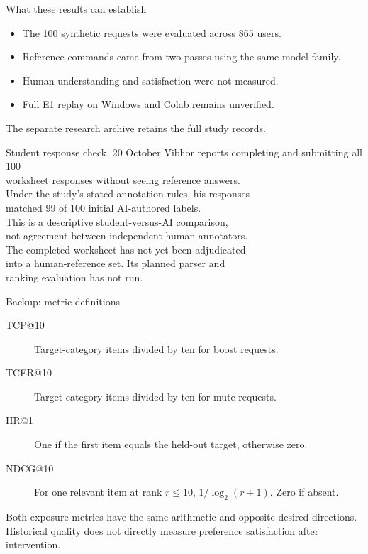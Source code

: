 \documentclass[10pt]{beamer}
\begin{document}
\begin{frame}{What these results can establish}
\small
\begin{itemize}
\item The 100 synthetic requests were evaluated across 865 users.
\item Reference commands came from two passes using the same model family.
\item Human understanding and satisfaction were not measured.
\item Full E1 replay on Windows and Colab remains unverified.
\end{itemize}
\vfill
\tiny The separate research archive retains the full study records.
\end{frame}

\begin{frame}{Student response check, 20 October}
\small
Vibhor reports completing and submitting all 100\\
worksheet responses without seeing reference answers.\\[0.2cm]
Under the study's stated annotation rules, his responses\\
matched 99 of 100 initial AI-authored labels.\\[0.2cm]
This is a descriptive student-versus-AI comparison,\\
not agreement between independent human annotators.\\[0.2cm]
The completed worksheet has not yet been adjudicated\\
into a human-reference set. Its planned parser and\\
ranking evaluation has not run.
\end{frame}

\appendix
\begin{frame}{Backup: metric definitions}
\begin{description}
\item[TCP@10] Target-category items divided by ten for boost requests.
\item[TCER@10] Target-category items divided by ten for mute requests.
\item[HR@1] One if the first item equals the held-out target, otherwise zero.
\item[NDCG@10] For one relevant item at rank $r\leq10$, $1/\log_2(r+1)$. Zero if absent.
\end{description}
\vspace{0.3cm}
Both exposure metrics have the same arithmetic and opposite desired directions. Historical quality does not directly measure preference satisfaction after intervention.
\end{frame}
\end{document}
